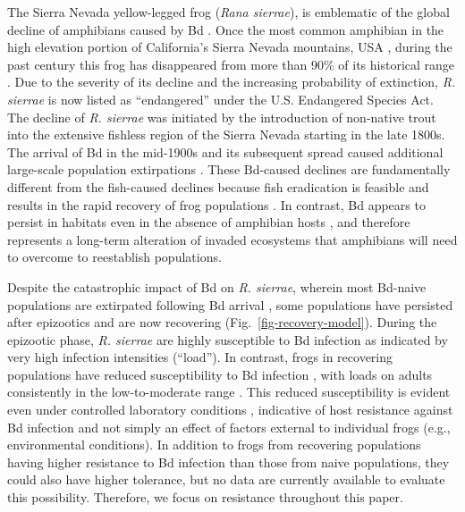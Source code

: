 \documentclass[
  letterpaper,
  DIV=11,
  numbers=noendperiod]{scrartcl}
\begin{document}
The Sierra Nevada yellow-legged frog (\emph{Rana sierrae}), is
emblematic of the global decline of amphibians caused by Bd
\citep{scheele2019}. Once the most common amphibian in the high
elevation portion of California's Sierra Nevada mountains, USA
\citep{grinnell1924}, during the past century this frog has disappeared
from more than 90\% of its historical range \citep{vredenburg2007}. Due
to the severity of its decline and the increasing probability of
extinction, \emph{R. sierrae} is now listed as ``endangered'' under the
U.S. Endangered Species Act. The decline of \emph{R. sierrae} was
initiated by the introduction of non-native trout into the extensive
fishless region of the Sierra Nevada \citep{bradford1989, knapp2000}
starting in the late 1800s. The arrival of Bd in the mid-1900s and its
subsequent spread \citep{vredenburg2019} caused additional large-scale
population extirpations \citep{vredenburg2010, rachowicz2006}. These
Bd-caused declines are fundamentally different from the fish-caused
declines because fish eradication is feasible \citep{knapp1998} and
results in the rapid recovery of frog populations
\citep{knapp2007, vredenburg2004}. In contrast, Bd appears to persist in
habitats even in the absence of amphibian hosts \citep{walker2007}, and
therefore represents a long-term alteration of invaded ecosystems that
amphibians will need to overcome to reestablish populations.

Despite the catastrophic impact of Bd on \emph{R. sierrae}, wherein most
Bd-naive populations are extirpated following Bd arrival
\citep{vredenburg2010}, some populations have persisted after epizootics
\citep{briggs2010} and are now recovering \citep{knapp2016}
(Fig.~\ref{fig-recovery-model}). During the epizootic phase, \emph{R.
sierrae} are highly susceptible to Bd infection as indicated by very
high infection intensities (``load''). In contrast, frogs in recovering
populations have reduced susceptibility to Bd infection
\citep{knapp2016}, with loads on adults consistently in the
low-to-moderate range \citep{briggs2010, knapp2011, joseph2018}. This
reduced susceptibility is evident even under controlled laboratory
conditions \citep{knapp2016}, indicative of host resistance against Bd
infection and not simply an effect of factors external to individual
frogs (e.g., environmental conditions). In addition to frogs from
recovering populations having higher resistance to Bd infection than
those from naive populations, they could also have higher tolerance, but
no data are currently available to evaluate this possibility. Therefore,
we focus on resistance throughout this paper.
\end{document}
